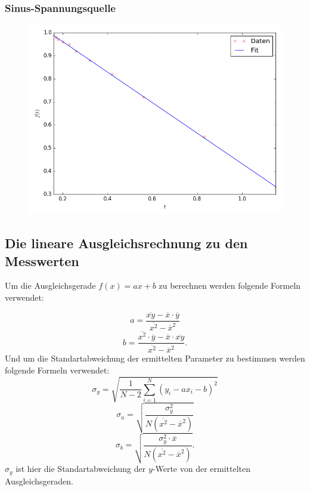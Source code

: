 \newpage
\subsubsection{Sinus-Spannungsquelle}

\begin{figure}[H]
  \centering
  \caption{}
  \includegraphics[width=\linewidth-150pt,height=\textheight-150pt,keepaspectratio]{Sinus.png}
  \label{fig:Sinus}
\end{figure}


\newpage
\subsection{Die lineare Ausgleichsrechnung zu den Messwerten}
Um die Ausgleichsgerade $f(x)=ax+b$ zu berechnen werden folgende Formeln verwendet:

\begin{equation}
a=\frac{ \overline{xy} - \overline{x} \cdot \overline{y}}{\overline{x^2} - \overline{x}^2}
\end{equation}
\begin{equation}
b=\frac{\overline{x^2} \cdot \overline{y} - \overline{x} \cdot \overline{xy}}{\overline{x^2} - \overline{x}^2}\text{.}
\end{equation}
Und um die Standartabweichung der ermittelten Parameter zu bestimmen werden folgende Formeln verwendet:
\begin{equation}
\sigma_y=\sqrt{\frac{1}{N-2}\sum\limits_{i=1}^{N}(y_i - a x_i - b)^2}
\end{equation}
\begin{equation}
\sigma_a=\sqrt{\frac{\sigma_y^2}{N ( \overline{x^2} - \overline{x} ^2 )}}
\end{equation}
\begin{equation}
\sigma_b=\sqrt{\frac{\sigma_y^2 \cdot \overline{x}}{N ( \overline{x^2} - \overline{x} ^2 )}}\text{.}
\end{equation}
$\sigma_y$ ist hier die Standartabweichung der $y$-Werte von der ermittelten Ausgleichsgeraden.


